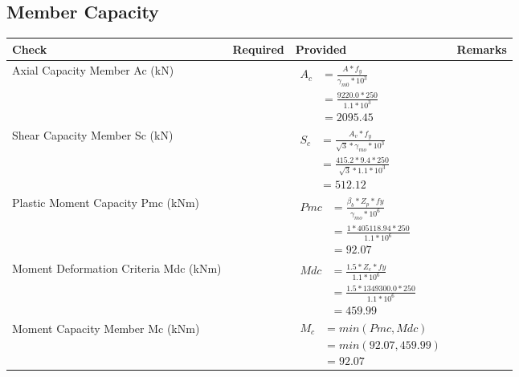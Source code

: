 \documentclass{article}%
\begin{document}
\subsection{Member Capacity}%
\label{subsec:MemberCapacity}%
\renewcommand{\arraystretch}{1.2}%
\begin{longtable}{|p{4cm}|p{5cm}|p{5.5cm}|p{1.5cm}|}%
\hline%
\rowcolor{OsdagGreen}%
Check&Required&Provided&Remarks\\%
\hline%
\endhead%
\hline%
Axial Capacity Member Ac (kN)&&$\begin{aligned} A_c &=\frac{A*f_y}{\gamma_{m0} *10^3}\\ &=\frac{9220.0*250}{1.1* 10^3}\\ &=2095.45\end{aligned}$&\\%
\hline%
Shear Capacity Member Sc (kN)&&$\begin{aligned} S_c &= \frac{A_v*f_y}{\sqrt{3}*\gamma_{mo} *10^3}\\ &=\frac{415.2*9.4*250}{\sqrt{3}*1.1 *10^3}\\ &=512.12\end{aligned}$&\\%
\hline%
Plastic Moment Capacity Pmc (kNm)&&$\begin{aligned} Pmc &= \frac{\beta_b * Z_p *fy}{\gamma_{mo} * 10^6}\\ &=\frac{1*405118.94*250}{1.1 * 10^6}\\ &=92.07\end{aligned}$&\\%
\hline%
Moment Deformation Criteria Mdc (kNm)&&$\begin{aligned} Mdc &= \frac{1.5 *Z_e *fy}{1.1* 10^6}\\ &= \frac{1.5 *1349300.0*250}{1.1* 10^6}\\ &= 459.99\end{aligned}$&\\%
\hline%
Moment Capacity Member Mc (kNm)&&$\begin{aligned} M_c &= min(Pmc,Mdc)\\ &=min(92.07,459.99)\\ &=92.07\end{aligned}$&\\%
\hline%
\end{longtable}

%
\newpage%
\end{document}
